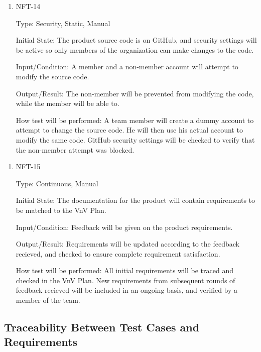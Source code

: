 \documentclass[12pt, titlepage]{article}
\begin{document}
\begin{enumerate}
    \item{NFT-14}

        Type: Security, Static, Manual
                            
        Initial State: The product source code is on GitHub, and security settings will be active so only 
            members of the \progname organization can make changes to the code.
                            
        Input/Condition: A member and a non-member account will attempt to modify the source code.
                            
        Output/Result: The non-member will be prevented from modifying the code, while the member will be able to.
                            
        How test will be performed: A team member will create a dummy account to attempt to change the source code. He will then use his actual
            account to modify the same code. GitHub security settings will be checked to verify that the non-member attempt was blocked.
\end{enumerate}

\begin{enumerate}
    \item{NFT-15}

        Type: Continuous, Manual
                            
        Initial State: The documentation for the product will contain requirements to be matched to the VnV Plan.
                            
        Input/Condition: Feedback will be given on the product requirements.
                            
        Output/Result: Requirements will be updated according to the feedback recieved, and checked to ensure complete requirement satisfaction.
                            
        How test will be performed: All initial requirements will be traced and checked in the VnV Plan. New requirements from subsequent rounds of 
          feedback recieved will be included in an ongoing basis, and verified by a member of the \progname team.
\end{enumerate}

\subsection{Traceability Between Test Cases and Requirements}
\end{document}
